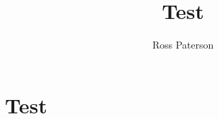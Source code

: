 \documentclass{amsart}
\title{Test}
\author{Ross Paterson}
\begin{document}
\maketitle
\section*{Test}
\lipsum[1-5]
\end{document}
